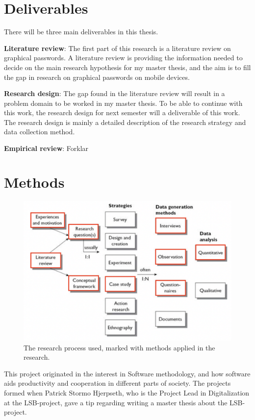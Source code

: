 \section{Deliverables} \label{sec:deliverables}
There will be three main deliverables in this thesis.

{\bf Literature review}: The first part of this research is a literature review on graphical passwords. A literature review is providing the information needed to decide on the main research hypothesis for my master thesis, and the aim is to fill the gap in research on graphical passwords on mobile devices.

{\bf Research design}: The gap found in the literature review will result in a problem domain to be worked in my master thesis. To be able to continue with this work, the research design for next semester will a deliverable of this work. The research design is mainly a detailed description of the research strategy and data collection method.

{\bf Empirical review}: Forklar


\section{Methods} \label{sec:methods}
\begin{figure}
    \includegraphics[width=\textwidth]{fig/empirisk_studie.png}
    \caption{The research process used, marked with methods applied in the research.}
    \label{fig:empirisk}
\end{figure}

This project originated in the interest in Software methodology, and how software aids productivity and cooperation in different parts of society. The projects formed when Patrick Stormo Hjerpseth, who is the Project Lead in Digitalization at the LSB-project, gave a tip regarding writing a master thesis about the LSB-project.

